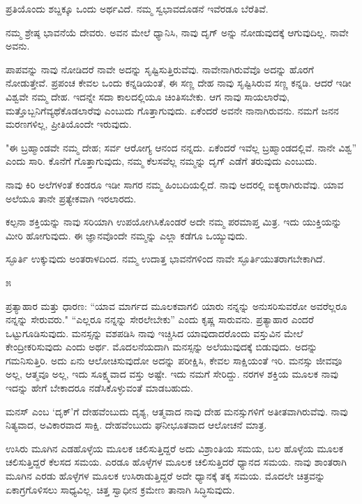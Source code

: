 \vskip 2pt

ಪ್ರತಿಯೊಂದು ಶಬ್ದಕ್ಕೂ ಒಂದು ಅರ್ಥವಿದೆ. ನಮ್ಮ ಸ್ವಭಾವದೊಡನೆ ಇವೆರಡೂ ಬೆರೆತಿವೆ.

\vskip 2pt

ನಮ್ಮ ಶ್ರೇಷ್ಠ ಭಾವನೆಯೆ ದೇವರು. ಅವನ ಮೇಲೆ ಧ್ಯಾನಿಸಿ, ನಾವು ದೃಗ್ ಅನ್ನು ನೋಡುವುದಕ್ಕೆ ಆಗುವುದಿಲ್ಲ. ನಾವೇ ಅವನು.

\vskip 2pt

ಪಾಪವನ್ನು ನಾವು ನೋಡಿದರೆ ನಾವೇ ಅದನ್ನು ಸೃಷ್ಟಿಸುತ್ತಿರುವೆವು. ನಾವೇನಾಗಿರುವೆವೊ ಅದನ್ನು ಹೊರಗೆ ನೋಡುತ್ತೇವೆ. ಪ್ರಪಂಚ ಕೇವಲ ಒಂದು ಕನ್ನಡಿಯಂತೆ, ಈ ಸಣ್ಣ ದೇಹ ನಾವು ಸೃಷ್ಟಿಸಿರುವ ಸಣ್ಣ ಕನ್ನಡಿ. ಆದರೆ ಇಡೀ ವಿಶ್ವವೇ ನಮ್ಮ ದೇಹ. ಇದನ್ನೇ ಸದಾ ಕಾಲದಲ್ಲಿಯೂ ಚಿಂತಿಸಬೇಕು. ಆಗ ನಾವು ಸಾಯಲಾರೆವು, ಮತ್ತೊಬ್ಬನಿಗೆ\break ವ್ಯಥೆಕೊಡಲಾರೆವು ಎಂಬುದು ಗೊತ್ತಾಗುವುದು. ಏಕೆಂದರೆ ಅವನೇ ನಾನಾಗಿರುವನು. ನಮಗೆ ಜನನ ಮರಣಗಳಿಲ್ಲ, ಪ್ರೀತಿಯೊಂದೇ ಇರುವುದು.

"ಈ ಬ್ರಹ್ಮಾಂಡವೇ ನಮ್ಮ ದೇಹ; ಸರ್ವ ಆರೋಗ್ಯ ಆನಂದ ನನ್ನದು. ಏಕೆಂದರೆ ಇವೆಲ್ಲ ಬ್ರಹ್ಮಾಂಡದಲ್ಲಿವೆ. ನಾನೇ ವಿಶ್ವ'' ಎಂದು ಸಾರಿ. ಕೊನೆಗೆ ಗೊತ್ತಾಗುವುದು, ನಮ್ಮ ಕೆಲಸವೆಲ್ಲ ನಮ್ಮನ್ನು ದೃಗ್ ಎಡೆಗೆ ತರುವುದು ಎಂಬುದು.

ನಾವು ಕಿರಿ ಅಲೆಗಳಂತೆ ಕಂಡರೂ ಇಡೀ ಸಾಗರ ನಮ್ಮ ಹಿಂಬದಿಯಲ್ಲಿದೆ. ನಾವು ಅದರಲ್ಲಿ ಐಕ್ಯರಾಗಿರುವೆವು. ಯಾವ ಅಲೆಯೂ ತಾನೇ ಪ್ರತ್ಯೇಕವಾಗಿ ಇರಲಾರದು.

ಕಲ್ಪನಾ ಶಕ್ತಿಯನ್ನು ನಾವು ಸರಿಯಾಗಿ ಉಪಯೋಗಿಸಿಕೊಂಡರೆ ಅದೇ ನಮ್ಮ ಪರಮಾಪ್ತ ಮಿತ್ರ. ಇದು ಯುಕ್ತಿಯನ್ನು ಮೀರಿ ಹೋಗುವುದು. ಈ ಜ್ಞಾನವೊಂದೇ ನಮ್ಮನ್ನು ಎಲ್ಲಾ ಕಡೆಗೂ ಒಯ್ಯುವುದು.

ಸ್ಫೂರ್ತಿ ಉಕ್ಕುವುದು ಅಂತರಾಳದಿಂದ. ನಮ್ಮ ಉದಾತ್ತ ಭಾವನೆಗಳಿಂದ ನಾವೇ ಸ್ಫೂರ್ತಿಯುತರಾಗಬೇಕಾಗಿದೆ.

\begin{center}
೫
\end{center}

ಪ್ರತ್ಯಾಹಾರ ಮತ್ತು ಧಾರಣ: “ಯಾವ ಮಾರ್ಗದ ಮೂಲಕವಾಗಲಿ ಯಾರು ನನ್ನನ್ನು ಅನುಸರಿಸುವರೋ ಅವರೆಲ್ಲರೂ ನನ್ನನ್ನು ಸೇರುವರು." “ಎಲ್ಲರೂ ನನ್ನನ್ನು ಸೇರಲೇಬೇಕು'' ಎಂದು ಕೃಷ್ಣ ಸಾರುವನು. ಪ್ರತ್ಯಾಹಾರ ಎಂದರೆ ಒಟ್ಟುಗೂಡಿಸುವುದು. ಮನಸ್ಸನ್ನು ವಶಪಡಿಸಿ ನಾವು ಇಚ್ಚಿಸಿದ ಯಾವುದಾದರೊಂದು ವಸ್ತುವಿನ ಮೇಲೆ ಕೇಂದ್ರೀಕರಿಸುವುದು ಎಂದು ಅರ್ಥ. ಮೊದಲನೆಯದಾಗಿ ಮನಸ್ಸನ್ನು ಅಲೆಯುವುದಕ್ಕೆ ಬಿಡುವುದು. ಅದನ್ನು ಗಮನಿಸುತ್ತಿರಿ. ಅದು ಏನು ಆಲೋಚಿಸುವುದೋ ಅದನ್ನು ಪರೀಕ್ಷಿಸಿ, ಕೇವಲ ಸಾಕ್ಷಿಯಂತೆ ಇರಿ. ಮನಸ್ಸು ಜೀವವೂ ಅಲ್ಲ, ಆತ್ಮವೂ ಅಲ್ಲ, ಇದು ಸೂಕ್ಷ್ಮವಾದ ವಸ್ತು ಅಷ್ಟೇ. ಇದು ನಮಗೆ ಸೇರಿದ್ದು. ನರಗಳ ಶಕ್ತಿಯ ಮೂಲಕ ನಾವು ಇದನ್ನು ಹೇಗೆ ಬೇಕಾದರೂ ನಡೆಸಿಕೊಳ್ಳುವಂತೆ ಮಾಡಬಹುದು.

ಮನಸ್ ಎಂಬ `ದೃಕ್'ಗೆ ದೇಹವೆಂಬುದು ದೃಶ್ಯ, ಆತ್ಮವಾದ ನಾವು ದೇಹ ಮನಸ್ಸುಗಳಿಗೆ ಅತೀತವಾಗಿರುವೆವು. ನಾವು ನಿತ್ಯವಾದ, ಅವಿಕಾರವಾದ ಸಾಕ್ಷಿ. ದೇಹವೆಂಬುದು ಘನೀಭೂತವಾದ ಆಲೋಚನೆ ಮಾತ್ರ.

ಉಸಿರು ಮೂಗಿನ ಎಡಹೊಳ್ಳೆಯ ಮೂಲಕ ಚಲಿಸುತ್ತಿದ್ದರೆ ಅದು ವಿಶ್ರಾಂತಿಯ ಸಮಯ, ಬಲ ಹೊಳ್ಳೆಯ ಮೂಲಕ ಚಲಿಸುತ್ತಿದ್ದರೆ ಕೆಲಸದ ಸಮಯ. ಎರಡೂ ಹೊಳ್ಳೆಗಳ ಮೂಲಕ ಚಲಿಸುತ್ತಿದರೆ ಧ್ಯಾನದ ಸಮಯ. ನಾವು ಶಾಂತರಾಗಿ ಮೂಗಿನ ಎರಡು ಹೊಳ್ಳೆಗಳ ಮೂಲಕ ಉಸಿರಾಡುತ್ತಿದ್ದರೆ ಅದೇ ಧ್ಯಾನಕ್ಕೆ ತಕ್ಕ ಸಮಯ. ಮೊದಲೇ ಚಿತ್ರವನ್ನು ಏಕಾಗ್ರಗೊಳಿಸಲು ಸಾಧ್ಯವಿಲ್ಲ. ಚಿತ್ತ ಸ್ವಾಧೀನ ಕ್ರಮೇಣ ತಾನಾಗಿ ಸಿದ್ಧಿಸುವುದು.

